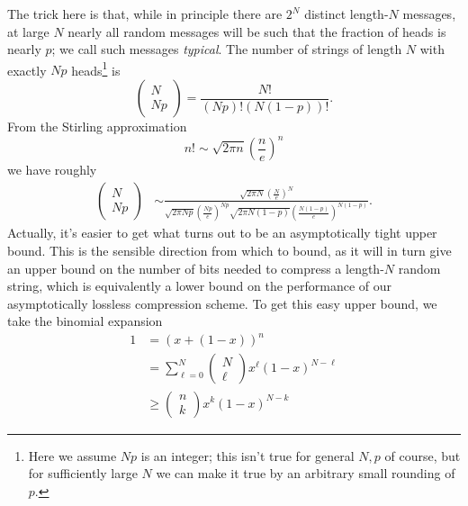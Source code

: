 \documentclass[11pt,letterpaper]{article}
\newcommand{\LP}{\left(}
\newcommand{\RP}{\right)}
\begin{document}
The trick here is that, while in principle there are $2^N$ distinct length-$N$ messages, at large $N$ nearly all random messages will be such that the fraction of heads is nearly $p$; we call such messages \textit{typical}. The number of strings of length $N$ with exactly $Np$ heads\footnote{Here we assume $Np$ is an integer; this isn't true for general $N,p$ of course, but for sufficiently large $N$ we can make it true by an arbitrary small rounding of $p$.} is \begin{equation}
\begin{pmatrix}
N  \\ Np
\end{pmatrix} = \frac{N!}{(Np)! (N(1-p))!}.
\end{equation}
From the Stirling approximation \begin{equation}
n! \sim \sqrt{2 \pi n} \LP \frac{n}{e} \RP^n
\end{equation}
we have roughly \begin{equation}
\begin{aligned}
\begin{pmatrix}
N  \\ Np
\end{pmatrix} & \sim \frac{\sqrt{2 \pi N} \LP \frac{N}{e} \RP^N}{\sqrt{2 \pi Np} \LP \frac{Np}{e} \RP^{Np} \sqrt{2 \pi N(1-p)} \LP \frac{N(1-p)}{e} \RP^{N(1-p)}}.
\end{aligned}
\end{equation}
Actually, it's easier to get what turns out to be an asymptotically tight upper bound. This is the sensible direction from which to bound, as it will in turn give an upper bound on the number of bits needed to compress a length-$N$ random string, which is equivalently a lower bound on the performance of our asymptotically lossless compression scheme. To get this easy upper bound, we take the binomial expansion \begin{equation}
\begin{aligned}
1 & = (x + (1-x))^n \\
& = \sum_{\ell = 0}^N \begin{pmatrix} N \\ \ell \end{pmatrix} x^\ell (1-x)^{N - \ell} \\
& \geq \begin{pmatrix} n \\ k \end{pmatrix} x^k (1-x)^{N - k}
\end{aligned}
\end{equation}
\end{document}
